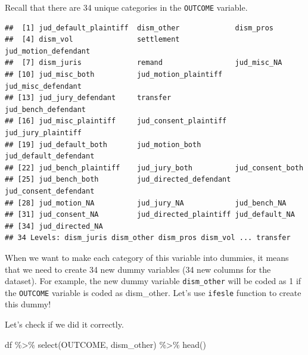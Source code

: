\documentclass[
]{article}
\newenvironment{Shaded}{\begin{snugshade}}{\end{snugshade}}
\newcommand{\DecValTok}[1]{\textcolor[rgb]{0.00,0.00,0.81}{#1}}
\newcommand{\FunctionTok}[1]{\textcolor[rgb]{0.00,0.00,0.00}{#1}}
\newcommand{\NormalTok}[1]{#1}
\newcommand{\OtherTok}[1]{\textcolor[rgb]{0.56,0.35,0.01}{#1}}
\newcommand{\SpecialCharTok}[1]{\textcolor[rgb]{0.00,0.00,0.00}{#1}}
\newcommand{\StringTok}[1]{\textcolor[rgb]{0.31,0.60,0.02}{#1}}
\begin{document}
Recall that there are 34 unique categories in the \texttt{OUTCOME}
variable.

\begin{Shaded}
\end{Shaded}

\begin{verbatim}
##  [1] jud_default_plaintiff  dism_other             dism_pros             
##  [4] dism_vol               settlement             jud_motion_defendant  
##  [7] dism_juris             remand                 jud_misc_NA           
## [10] jud_misc_both          jud_motion_plaintiff   jud_misc_defendant    
## [13] jud_jury_defendant     transfer               jud_bench_defendant   
## [16] jud_misc_plaintiff     jud_consent_plaintiff  jud_jury_plaintiff    
## [19] jud_default_both       jud_motion_both        jud_default_defendant 
## [22] jud_bench_plaintiff    jud_jury_both          jud_consent_both      
## [25] jud_bench_both         jud_directed_defendant jud_consent_defendant 
## [28] jud_motion_NA          jud_jury_NA            jud_bench_NA          
## [31] jud_consent_NA         jud_directed_plaintiff jud_default_NA        
## [34] jud_directed_NA       
## 34 Levels: dism_juris dism_other dism_pros dism_vol ... transfer
\end{verbatim}

When we want to make each category of this variable into dummies, it
means that we need to create 34 new dummy variables (34 new columns for
the dataset). For example, the new dummy variable \texttt{dism\_other}
will be coded as 1 if the \texttt{OUTCOME} variable is coded as
dism\_other. Let's use \texttt{ifesle} function to create this dummy!

\begin{Shaded}
\end{Shaded}

Let's check if we did it correctly.

\begin{Shaded}
\begin{Highlighting}[]
\NormalTok{df }\SpecialCharTok{\%\textgreater{}\%} \FunctionTok{select}\NormalTok{(OUTCOME, dism\_other) }\SpecialCharTok{\%\textgreater{}\%} \FunctionTok{head}\NormalTok{()}
\end{Highlighting}
\end{Shaded}
\end{document}
